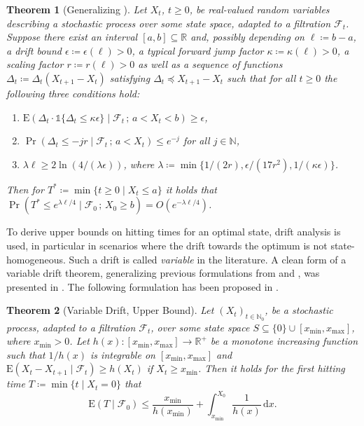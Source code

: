 \documentclass[11pt, a4paper]{article}
\newcommand{\xmin}{x_{\min}}
\newcommand{\xmax}{x_{\max}}
\newtheorem{theorem}{Theorem}
\DeclareMathOperator{\Prob}{Pr}
\newcommand*{\E}{\mathrm{E}}
\newcommand{\indic}[1]{\mathds{1}\{#1\}}
\newcommand{\N}{\mathds{N}}
\newcommand{\R}{\mathds{R}}
\newcommand{\filt}{\mathcal{F}}
\newcommand{\filtt}{\mathcal{F}_t}
\begin{document}
\begin{theorem}[Generalizing \cite{OlivetoWittTCS15}]\label{theo:negative-drift-scaling-2017}
  Let $X_t$, $t\ge 0$, be real-valued random variables describing a
	stochastic process over some state space, adapted to a filtration $\filtt$. Suppose 
  there exist an interval $[a,b]\subseteq \R$
   and, possibly depending on
  $\ell\coloneqq b-a$, a drift bound $\epsilon\coloneqq \epsilon(\ell)>0$, 
	a typical forward jump factor $\kappa\coloneqq \kappa(\ell)>0$,
	a scaling factor $r\coloneqq r(\ell)>0$ 
	as well as a sequence of functions $\Delta_t\coloneqq \Delta_t(X_{t+1}-X_t)$ satisfying 
	$\Delta_t\preceq X_{t+1}-X_t$ 
   such that  
  for all $t\ge 0$ the following three conditions hold:
  \begin{enumerate}
  \item 
	$\E(\Delta_t\cdot\indic{\Delta_t\le \kappa\epsilon  } \mid \filtt \,;\, a< X_t <b) \ge \epsilon$,
  \item $\Prob(\Delta_t\le -jr \mid \filtt  \,;\, a< X_t)  \le  e^{-j}$ for all $j\in \N$, 
  \item
  $  \lambda \ell \ge 2\ln(4/(\lambda \epsilon))$, 
	where $\lambda\coloneqq \min\{1/(2r),\epsilon/(17r^2),1/(\kappa\epsilon)\}$. 
  \end{enumerate}
  Then for   $T^*\coloneqq \min\{t\ge
  0 \mid X_t\le a \}$ it holds that $\Prob(T^*\le
  e^{\lambda\ell/4}\mid \filt_0 \,;\, X_0\ge b) = O(e^{-\lambda\ell/4})$.
\end{theorem}

To derive upper bounds on hitting times for an optimal state, drift analysis is used, 
in particular in scenarios where the drift towards the optimum is not state-homogeneous.  Such a drift is called \emph{variable} in the literature. 
A clean form of a variable drift theorem, generalizing 
previous formulations from \cite{Johannsen10} and \cite{MitavskiyVariable}, 
was presented in \cite{RoweSudholtTCS2014}. The following formulation 
has been proposed in \cite{LehreWittISAAC14}.

\begin{theorem}[Variable Drift, Upper Bound] 
\label{theo:variable-drift}
Let $(X_t)_{t\in\N_0}$, be a stochastic process,  adapted to a filtration $\filtt$,  over some state space  $S\subseteq \{0\}\cup [\xmin,\xmax]$, where $\xmin>0$.  
Let  $h(x)\colon [\xmin,\xmax]\to\R^+$ be a monotone increasing function such that 
$1/h(x)$ is integrable on $[\xmin,\xmax]$ and 
$\E(X_t-X_{t+1} \mid \filtt) \ge h(X_t)$ if $X_t\ge \xmin$.
 Then it holds for the first hitting time 
$T\coloneqq \min\{t\mid X_t=0\}$ that 
\[
\E(T\mid \filt_0) \le 
\frac{\xmin}{h(\xmin)} + \int_{\xmin}^{X_0} \frac{1}{h(x)} \,\mathrm{d}x.
\] 
\end{theorem}
\end{document}
